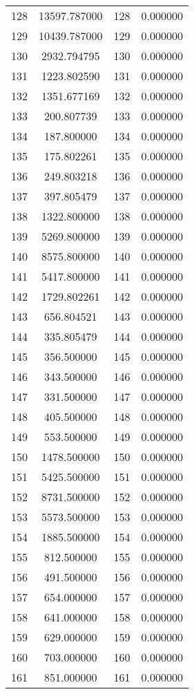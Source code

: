 \documentclass[12pt]{article}
\begin{document}
\begin{longtable}{@{}cccc@{}}
128 & 13597.787000 & 128 & 0.000000 \\
129 & 10439.787000 & 129 & 0.000000 \\
130 & 2932.794795 & 130 & 0.000000 \\
131 & 1223.802590 & 131 & 0.000000 \\
132 & 1351.677169 & 132 & 0.000000 \\
133 & 200.807739 & 133 & 0.000000 \\
134 & 187.800000 & 134 & 0.000000 \\
135 & 175.802261 & 135 & 0.000000 \\
136 & 249.803218 & 136 & 0.000000 \\
137 & 397.805479 & 137 & 0.000000 \\
138 & 1322.800000 & 138 & 0.000000 \\
139 & 5269.800000 & 139 & 0.000000 \\
140 & 8575.800000 & 140 & 0.000000 \\
141 & 5417.800000 & 141 & 0.000000 \\
142 & 1729.802261 & 142 & 0.000000 \\
143 & 656.804521 & 143 & 0.000000 \\
144 & 335.805479 & 144 & 0.000000 \\
145 & 356.500000 & 145 & 0.000000 \\
146 & 343.500000 & 146 & 0.000000 \\
147 & 331.500000 & 147 & 0.000000 \\
148 & 405.500000 & 148 & 0.000000 \\
149 & 553.500000 & 149 & 0.000000 \\
150 & 1478.500000 & 150 & 0.000000 \\
151 & 5425.500000 & 151 & 0.000000 \\
152 & 8731.500000 & 152 & 0.000000 \\
153 & 5573.500000 & 153 & 0.000000 \\
154 & 1885.500000 & 154 & 0.000000 \\
155 & 812.500000 & 155 & 0.000000 \\
156 & 491.500000 & 156 & 0.000000 \\
157 & 654.000000 & 157 & 0.000000 \\
158 & 641.000000 & 158 & 0.000000 \\
159 & 629.000000 & 159 & 0.000000 \\
160 & 703.000000 & 160 & 0.000000 \\
161 & 851.000000 & 161 & 0.000000 \\

\end{longtable}
\end{document}
